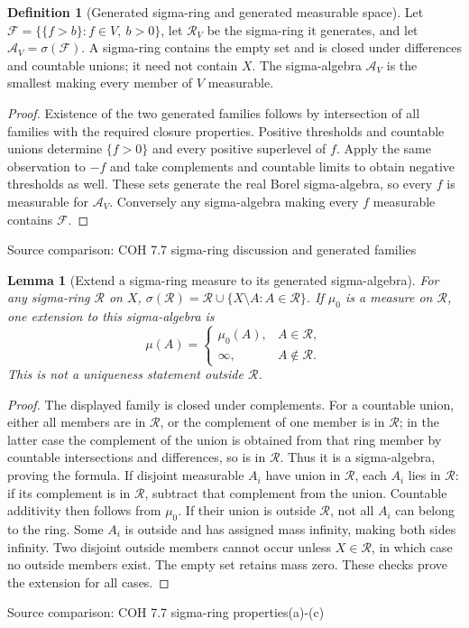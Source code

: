 \documentclass[11pt,oneside,openany]{book}
\newtheorem{lemma}[theorem]{Lemma}
\theoremstyle{definition}
\newtheorem{definition}[theorem]{Definition}
\theoremstyle{remark}
\newcommand{\family}[1]{}
\newcommand{\source}[1]{\par\begingroup\small\sffamily\color{black!65}Source comparison: #1\par\endgroup}
\begin{document}
\begin{definition}[Generated sigma-ring and generated measurable space]\family{D11.23.generated_ring_algebra}\label{d11:23:generated-ring-algebra}
Let $\mathcal F=\{\{f>b\}:f\in V,\ b>0\}$, let $\mathcal R_V$ be the sigma-ring it generates, and let $\mathcal A_V=\sigma(\mathcal F)$. A sigma-ring contains the empty set and is closed under differences and countable unions; it need not contain $X$. The sigma-algebra $\mathcal A_V$ is the smallest making every member of $V$ measurable.
\end{definition}
\begin{proof}
Existence of the two generated families follows by intersection of all families with the required closure properties. Positive thresholds and countable unions determine $\{f>0\}$ and every positive superlevel of $f$. Apply the same observation to $-f$ and take complements and countable limits to obtain negative thresholds as well. These sets generate the real Borel sigma-algebra, so every $f$ is measurable for $\mathcal A_V$. Conversely any sigma-algebra making every $f$ measurable contains $\mathcal F$.
\end{proof}
\source{COH 7.7 sigma-ring discussion and generated families}

\begin{lemma}[Extend a sigma-ring measure to its generated sigma-algebra]\family{D11.23.sigma_ring_extension}\label{d11:23:sigma-ring-extension}
For any sigma-ring $\mathcal R$ on $X$, $\sigma(\mathcal R)=\mathcal R\cup\{X\setminus A:A\in\mathcal R\}$. If $\mu_0$ is a measure on $\mathcal R$, one extension to this sigma-algebra is
\[\mu(A)=\begin{cases}\mu_0(A),&A\in\mathcal R,\\ \infty,&A\notin\mathcal R.\end{cases}\]
This is not a uniqueness statement outside $\mathcal R$.
\end{lemma}
\begin{proof}
The displayed family is closed under complements. For a countable union, either all members are in $\mathcal R$, or the complement of one member is in $\mathcal R$; in the latter case the complement of the union is obtained from that ring member by countable intersections and differences, so is in $\mathcal R$. Thus it is a sigma-algebra, proving the formula. If disjoint measurable $A_i$ have union in $\mathcal R$, each $A_i$ lies in $\mathcal R$: if its complement is in $\mathcal R$, subtract that complement from the union. Countable additivity then follows from $\mu_0$. If their union is outside $\mathcal R$, not all $A_i$ can belong to the ring. Some $A_i$ is outside and has assigned mass infinity, making both sides infinity. Two disjoint outside members cannot occur unless $X\in\mathcal R$, in which case no outside members exist. The empty set retains mass zero. These checks prove the extension for all cases.
\end{proof}
\source{COH 7.7 sigma-ring properties(a)-(c)}
\end{document}

